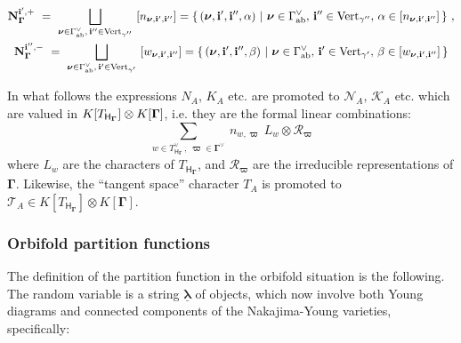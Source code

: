 \documentclass[12pt]{amsart}
\newcommand {\3}{\underline{\bf 3}}
\newcommand {\4}{\underline{\bf 4}}
\newcommand {\6}{\underline{\bf 6}}
\newcommand{\beq}{\begin{equation}}
\newcommand{\eeq}{\end{equation}}
\newcommand {\bN}   {\mathbf{N}}
\newcommand {\ib} {\mathbf{i}}
\newcommand {\Hf} {\mathsf{H}}
\newcommand {\bnu} {{\boldsymbol{\nu}}}
\newcommand {\bla} {\underline{\boldsymbol{\lambda}}}
\newcommand {\bom} {{\boldsymbol{\varpi}}}
\newcommand {\CalK} {\mathcal K}
\newcommand {\CalN} {\mathcal N}
\newcommand {\CalR} {\mathcal R}
\newcommand {\CalT} {\mathcal T}
\newcommand{\Gammadi}{\boldsymbol{\Gamma}}
\newcommand{\Gamav}{{\Gamma}^{\vee}_{\rm ab}}
\begin{document}
\begin{multline}
 {\bN}_{\Gammadi}^{{\ib}', +}  \ = \  \bigsqcup_{{\bnu} \in {\Gamav}, \, {\ib}'' \in {\rm Vert}_{\gamma''}}\ [n_{{\bnu}, {\ib}', {\ib''}}] = \left\{ \, ({\bnu}, {\ib}', {\ib}'', {\alpha}) \ | \  {\bnu} \in {\Gamav}, \, {\ib}'' \in {\rm Vert}_{\gamma''}, \, {\alpha} \in [n_{{\bnu}, {\ib}', {\ib''}}] \, \right\} \, , \\
 {\bN}_{\Gammadi}^{{\ib}'', -} \ = \  \bigsqcup_{{\bnu} \in {\Gamav}, \, {\ib}' \in {\rm Vert}_{\gamma'}}\ [w_{{\bnu}, {\ib}', {\ib''}}] = \left\{ \, ({\bnu}, {\ib}', {\ib''}, {\beta}) \ | \  {\bnu} \in {\Gamav}, \, {\ib}' \in {\rm Vert}_{\gamma'}, \, {\beta} \in [w_{{\bnu}, {\ib}', {\ib''}}] \, \right\} \\
\label{eq:nlabaleale2}
\end{multline}




In what follows the expressions $N_A$, $K_A$ etc. are promoted to ${\CalN}_{A}$, ${\CalK}_{A}$ etc. which are valued in $K[T_{{\Hf}_{\bf\Gamma}}] \otimes K[{\bf\Gamma}]$, 
i.e. they are the formal linear combinations:
\beq
\sum_{w \in T_{{\Hf}_{\Gammadi}}^{\vee}\, , \ {\bom} \in {\Gammadi}^{\vee}} \ n_{w, {\bom}} \ L_{w} \otimes {\CalR}_{\bom}
\eeq
where $L_w$ are the characters of $T_{{\Hf}_{\Gammadi}}$, and ${\CalR}_{\bom}$
are the irreducible representations of $\Gammadi$. Likewise, the ``tangent space'' character $T_{A}$ is promoted to ${\CalT}_{A} \in K[T_{{\Hf}_{\Gammadi}}] \otimes K[{\Gammadi}]$. 



\subsubsection{Orbifold partition functions}

The definition of the partition function in the orbifold situation is the following. The random variable is a string $\bla$ of objects, which now involve both Young diagrams and connected components of the Nakajima-Young varieties, specifically:
\end{document}
